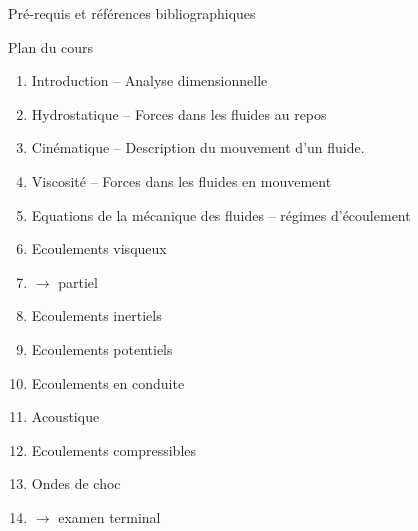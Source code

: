 \begin{frame}{Pré-requis et références bibliographiques}
\begin{itemize}
\end{itemize}

\end{frame}

\begin{frame}{Plan du cours}

\small

\begin{enumerate}
\item
  Introduction -- Analyse dimensionnelle
\item
  Hydrostatique -- Forces dans les fluides au repos
  \item
  Cinématique -- Description du mouvement d'un fluide.
\item 
  Viscosité -- Forces dans les fluides en mouvement
\item
  Equations de la mécanique des fluides -- régimes d'écoulement
\item
  Ecoulements visqueux
\smallskip
\item[] \qquad $\rightarrow$ partiel
\smallskip
\item
  Ecoulements inertiels
\item
  Ecoulements potentiels
\item
  Ecoulements en conduite
\item
  Acoustique
\item
  Ecoulements compressibles
\item
  Ondes de choc
\smallskip
\item[] \qquad $\rightarrow$ examen terminal
\end{enumerate}

\vspace{5mm}

\end{frame}


